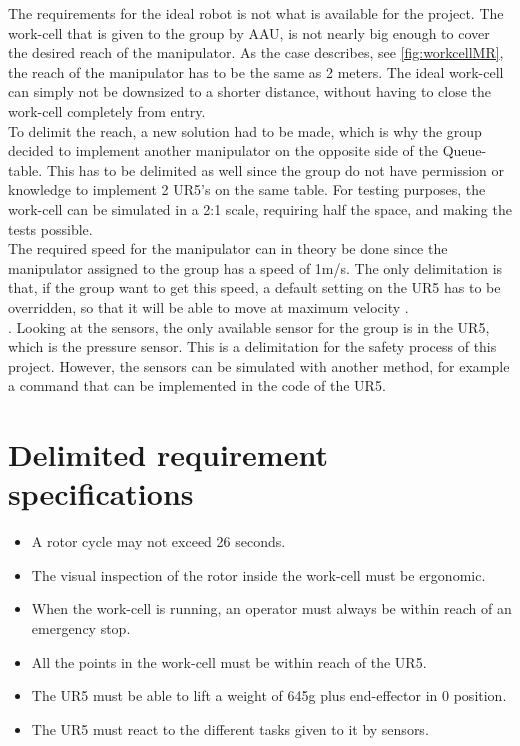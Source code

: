 The requirements for the ideal robot is not what is available for the project. 
The work-cell that is given to the group by AAU, is not nearly big enough to cover the desired reach of the manipulator. As the case describes, see \ref{fig:workcellMR}, the reach of the manipulator has to be the same as 2 meters. The ideal work-cell can simply not be downsized to a shorter distance, without having to close the work-cell completely from entry.\\
To delimit the reach, a new solution had to be made, which is why the group decided to implement another manipulator on the opposite side of the Queue-table. This has to be delimited as well since the group do not have permission or knowledge to implement 2 UR5's on the same table.
For testing purposes, the work-cell can be simulated in a 2:1 scale, requiring half the space, and making the tests possible. \\
The required speed for the manipulator can in theory be done since the manipulator assigned to the group has a speed of 1m/s. The only delimitation is that, if the group want to get this speed, a default setting on the UR5 has to be overridden, so that it will be able to move at maximum velocity \cite{UserManual}.\\.
Looking at the sensors, the only available sensor for the group is in the UR5, which is the pressure sensor. This is a delimitation for the safety process of this project. However, the sensors can be simulated with another method, for example a command that can be implemented in the code of the UR5.\\

\section{Delimited requirement specifications}

\begin{itemize}
    \item A rotor cycle may not exceed 26 seconds.
    \item The visual inspection of the rotor inside the work-cell must be ergonomic.
    \item When the work-cell is running, an operator must always be within reach of an emergency stop.
    \item All the points in the work-cell must be within reach of the UR5.
    \item The UR5 must be able to lift a weight of 645g plus end-effector in 0 position.
    \item The UR5 must react to the different tasks given to it by sensors.
\end{itemize}